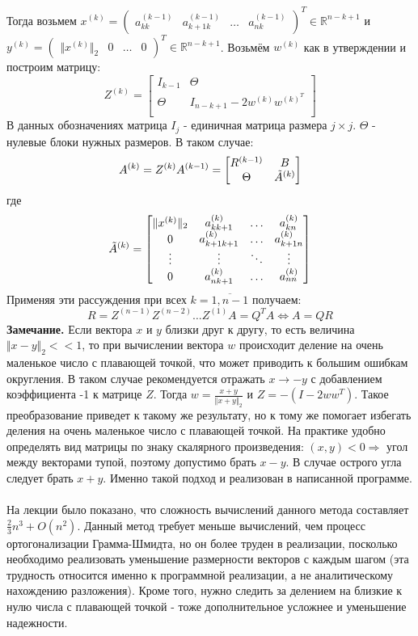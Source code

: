 \documentclass[a4paper,12pt,titlepage,final]{article}
\begin{document}
Тогда возьмем  $x^{(k)} = \begin{pmatrix} a_{kk}^{(k-1)} & a_{k+1k}^{(k-1)} & \ldots & a_{nk}^{(k-1)}\end{pmatrix}^T \in \mathbb{R}^{n-k+1}$ и  $y^{(k)} = \begin{pmatrix} \Vert x^{(k)} \Vert_2 & 0 & \ldots & 0\end{pmatrix}^T \in \mathbb{R}^{n-k+1}$. Возьмём $w^{(k)}$ как в утверждении и построим матрицу:
$$Z^{(k)} = \begin{bmatrix}
    I_{k-1} & \Theta \\
    \Theta & I_{n - k + 1} - 2w^{(k)}w^{(k)^T} \\
\end{bmatrix} $$
В данных обозначениях матрица $I_j$ - единичная матрица размера $j \times j$. $\Theta$ - нулевые блоки нужных размеров. В таком случае:
$$A^{(k)} = Z^{(k)}A^{(k-1)} = \begin{bmatrix}
    R^{(k-1)} & B \\
    \Theta & \Tilde{A}^{(k)}
\end{bmatrix}
$$
где $$
\Tilde{A}^{(k)} = \begin{bmatrix}
    \Vert x^{(k)} \Vert_2 & a_{kk+1}^{(k)} & \ldots & a_{kn}^{(k)} \\
    0 & a_{k+1k+1}^{(k)} & \ldots & a_{k+1n}^{(k)} \\
    \vdots & \vdots & \ddots & \vdots \\
    0 & a_{nk+1}^{(k)} & \ldots & a_{nn}^{(k)} \\
\end{bmatrix}
$$
Применяя эти рассуждения при всех $k = \overline{1, n-1}$ получаем:
$$R = Z^{(n-1)}Z^{(n-2)}\ldots Z^{(1)}A = Q^TA \Leftrightarrow A = QR$$
\textbf{Замечание.} Если вектора $x$ и $y$ близки друг к другу, то есть величина $\Vert x - y \Vert_2 << 1$, то при вычислении вектора $w$ происходит деление на очень маленькое число с плавающей точкой, что может приводить к большим ошибкам округления. В таком случае рекомендуется отражать $x \to -y$ с добавлением коэффициента -1 к матрице $Z$. Тогда $w = \frac{x + y}{\Vert x + y \Vert_2}$ и $Z = -(I - 2ww^T)$. Такое преобразование приведет к такому же результату, но к тому же помогает избегать деления на очень маленькое число с плавающей точкой. На практике удобно определять вид матрицы по знаку скалярного произведения: $(x, y) < 0 \Rightarrow $ угол между векторами тупой, поэтому допустимо брать $x - y$. В случае острого угла следует брать $x + y$. Именно такой подход и реализован в написанной программе.\\ \\
На лекции было показано, что сложность вычислений данного метода составляет $\frac{2}{3}n^3 + O(n^2)$. Данный метод требует меньше вычислений, чем процесс ортогонализации Грамма-Шмидта, но он более труден в реализации, посколько необходимо реализовать уменьшение размерности векторов с каждым шагом (эта трудность относится именно к программной реализации, а не аналитическому нахождению разложения). Кроме того, нужно следить за делением на близкие к нулю числа с плавающей точкой - тоже дополнительное усложнее и уменьшение надежности.
\end{document}
